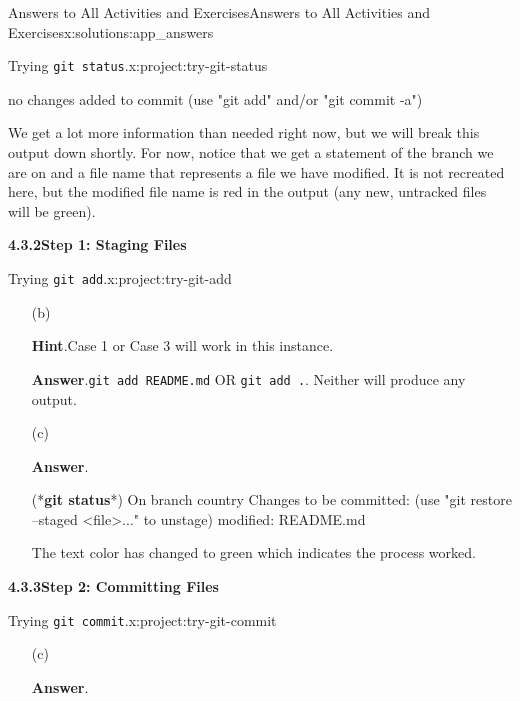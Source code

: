 \documentclass[oneside,10pt,]{book}
\newcommand{\blocktitlefont}{\relax}
\newcommand{\mono}[1]{\texttt{#1}}
\newcommand{\consoleinput}[1]{\textbf{#1}}
\begin{document}
\begin{solutions-chapter}{Answers to All Activities and Exercises}{}{Answers to All Activities and Exercises}{}{}{x:solutions:app_answers}
\begin{projectsolution}{4.4}{Trying \mono{git status}.}{x:project:try-git-status}
\begin{console}{0}{1}{0}
no changes added to commit (use "git add" and/or "git commit -a")
\end{console}
We get a lot more information than needed right now, but we will break this output down shortly. For now, notice that we get a statement of the branch we are on and a file name that represents a file we have modified. It is not recreated here, but the modified file name is red in the output (any new, untracked files will be green).%
\end{projectsolution}%
\par\medskip
\noindent\textbf{\Large{}4.3.2\space\textperiodcentered\space{}Step 1: Staging Files}
\begin{projectsolution}{4.5}{Trying \mono{git add}.}{x:project:try-git-add}%
\begin{enumerate}[font=\bfseries,label=(\alph*),ref=\alph*]
\item[(b)]\par\smallskip%
\noindent\textbf{\blocktitlefont Hint}.\hypertarget{g:hint:idm479812568-back}{}\quad{}Case 1 or Case 3 will work in this instance.%
\par\smallskip%
\noindent\textbf{\blocktitlefont Answer}.\hypertarget{g:answer:idm479813336-back}{}\quad{}\mono{git add README.md} OR \mono{git add .}. Neither will produce any output.%
\item[(c)]\par\smallskip%
\noindent\textbf{\blocktitlefont Answer}.\hypertarget{g:answer:idm479812952-back}{}\quad{}\begin{console}{0}{1}{0}
(*\consoleinput{git status}*)
On branch country
Changes to be committed:
  (use "git restore --staged <file>..." to unstage)
        modified:   README.md
\end{console}
The text color has changed to green which indicates the process worked.%
\end{enumerate}
\end{projectsolution}%
\par\medskip
\noindent\textbf{\Large{}4.3.3\space\textperiodcentered\space{}Step 2: Committing Files}
\begin{projectsolution}{4.6}{Trying \mono{git commit}.}{x:project:try-git-commit}%
\begin{enumerate}[font=\bfseries,label=(\alph*),ref=\alph*]
\item[(c)]\par\smallskip%
\noindent\textbf{\blocktitlefont Answer}.\hypertarget{g:answer:idm479793624-back}{}\quad{}\begin{console}{0}{1}{0}

\end{console}
\end{enumerate}
\end{projectsolution}
\end{solutions-chapter}
\end{document}
